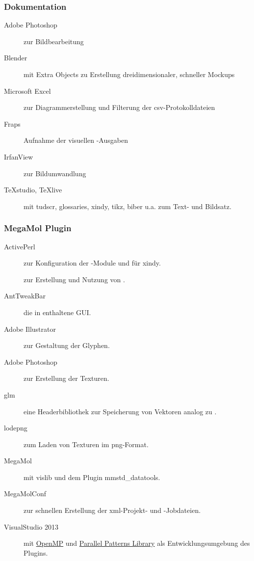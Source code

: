 \subsubsection{Dokumentation}
\begin{description}
	\item [Adobe Photoshop] zur Bildbearbeitung
	\item [Blender] mit Extra Objects zu Erstellung dreidimensionaler, schneller Mockups
	\item [Microsoft Excel] zur Diagrammerstellung und Filterung der \gls{csv}-Protokolldateien
	\item [Fraps] Aufnahme der visuellen -Ausgaben
	\item [IrfanView] zur Bildumwandlung
	\item [TeXstudio, TeXlive] mit tudscr, glossaries, xindy, tikz, biber u.a. zum Text- und Bildsatz.
\end{description}

\subsubsection{MegaMol Plugin}
\begin{description}
	\item [ActivePerl] zur Konfiguration der -Module und für xindy.
	\item [\ANN] zur Erstellung und Nutzung von .
	\item [AntTweakBar] die in  enthaltene GUI.
	\item [Adobe Illustrator] zur Gestaltung der Glyphen.
	\item [Adobe Photoshop] zur Erstellung der Texturen.
	\item [\gls{glm}] eine Headerbibliothek zur Speicherung von Vektoren analog zu \OGL.
	\item [lodepng] zum Laden von Texturen im \gls{png}-Format.
	\item [MegaMol] mit vislib und dem Plugin mmstd\_datatools.
	\item [MegaMolConf] zur schnellen Erstellung der \gls{xml}-Projekt- und -Jobdateien.
	\item [VisualStudio 2013] mit \href{http://openmp.org/}{OpenMP} und \href{https://msdn.microsoft.com/en-us/library/dd492418.aspx}{Parallel Patterns Library} als Entwicklungsumgebung des Plugins.
\end{description}

